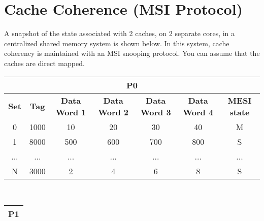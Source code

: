 \section{Cache Coherence (MSI Protocol)}
%
A snapshot of the state associated with 2 caches, on 2 separate cores, in a centralized shared memory
system is shown below. In this system, cache coherency is maintained with an MSI snooping protocol.
You can assume that the caches are direct mapped.
%
\begin{center}
\begin{tabular}{|ccccccc|}
\hline
\multicolumn{7}{|c|}{\textbf{P0}}                                                                                          \\ \hline
\multicolumn{1}{|c|}{\textbf{Set}} & \multicolumn{1}{c|}{\textbf{Tag}} & \multicolumn{1}{c|}{\textbf{Data Word 1}} & \multicolumn{1}{c|}{\textbf{Data Word 2}} & \multicolumn{1}{c|}{\textbf{Data Word 3}} & \multicolumn{1}{c|}{\textbf{Data Word 4}} & \textbf{MESI state} \\ \hline
\multicolumn{1}{|c|}{0}            & \multicolumn{1}{c|}{1000}         & \multicolumn{1}{c|}{10}                   & \multicolumn{1}{c|}{20}                   & \multicolumn{1}{c|}{30}                   & \multicolumn{1}{c|}{40}                   & M                   \\ \hline
\multicolumn{1}{|c|}{1}            & \multicolumn{1}{c|}{8000}         & \multicolumn{1}{c|}{500}                  & \multicolumn{1}{c|}{600}                  & \multicolumn{1}{c|}{700}                  & \multicolumn{1}{c|}{800}                  & S                   \\ \hline
\multicolumn{1}{|c|}{...}          & \multicolumn{1}{c|}{...}          & \multicolumn{1}{c|}{...}                  & \multicolumn{1}{c|}{...}                  & \multicolumn{1}{c|}{...}                  & \multicolumn{1}{c|}{...}                  & ...                 \\ \hline
\multicolumn{1}{|c|}{N}            & \multicolumn{1}{c|}{3000}         & \multicolumn{1}{c|}{2}                    & \multicolumn{1}{c|}{4}                    & \multicolumn{1}{c|}{6}                    & \multicolumn{1}{c|}{8}                    & S                   \\ \hline
\end{tabular}
\\ \vspace{5mm}
\begin{tabular}{|ccccccc|}
\hline
\multicolumn{7}{|c|}{\textbf{P1}}                                                                                                                                                                                                                                            \\ \hline

\end{tabular}
\end{center}
